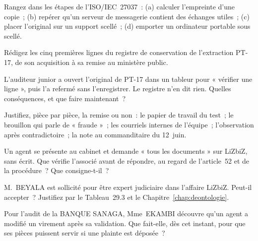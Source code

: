 \begin{boxexo}[title={\ding{45}\quad Exercice~29.2. Les étapes \niveaubase}]
Rangez dans les étapes de l'ISO/IEC~27037~: (a) calculer l'empreinte d'une
copie~; (b) repérer qu'un serveur de messagerie contient des échanges
utiles~; (c) placer l'original sur un support scellé~; (d) emporter un
ordinateur portable sous scellé.
\end{boxexo}

\begin{boxexo}[title={\ding{45}\quad Exercice~29.3. Le registre \niveaumoyen}]
Rédigez les cinq premières lignes du registre de conservation de
l'extraction PT-17, de son acquisition à sa remise au ministère public.
\end{boxexo}

\begin{boxexo}[title={\ding{45}\quad Exercice~29.4. Une brèche \niveaumoyen}]
L'auditeur junior a ouvert l'original de PT-17 dans un tableur pour
« vérifier une ligne », puis l'a refermé sans l'enregistrer. Le registre
n'en dit rien. Quelles conséquences, et que faire maintenant~?
\end{boxexo}

\begin{boxexo}[title={\ding{45}\quad Exercice~29.5. Ce qu'on ne remet pas \niveaumoyen}]
Justifiez, pièce par pièce, la remise ou non~: le papier de travail du
test~; le brouillon qui parle de « fraude »~; les courriels internes de
l'équipe~; l'observation après contradictoire~; la note au commanditaire du
12~juin.
\end{boxexo}

\begin{boxexo}[title={\ding{45}\quad Exercice~29.6. Article 52 \niveaumoyen}]
Un agent se présente au cabinet et demande « tous les documents » sur
LiZbiZ, sans écrit. Que vérifie l'associé avant de répondre, au regard de
l'article~52 et de la procédure~? Que consigne-t-il~?
\end{boxexo}

\begin{boxexo}[title={\ding{45}\quad Exercice~29.7. Trois rôles \niveaubase}]
M.~BEYALA est sollicité pour être expert judiciaire dans l'affaire LiZbiZ.
Peut-il accepter~? Justifiez par le Tableau~29.3 et le
Chapitre~\ref{chap:deontologie}.
\end{boxexo}

\begin{boxexo}[title={\ding{45}\quad Exercice~29.8. Un dossier qui servira \niveaumoyen}]
Pour l'audit de la BANQUE SANAGA, Mme~EKAMBI découvre qu'un agent a modifié
un virement après sa validation. Que fait-elle, dès cet instant, pour que
ses pièces puissent servir si une plainte est déposée~?
\end{boxexo}

